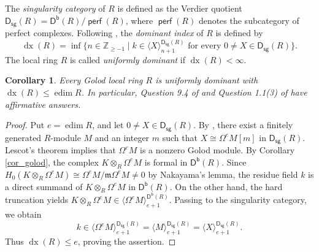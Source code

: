 \documentclass[10pt]{amsart}
\newtheorem{cor}[thm]{Corollary}
\theoremstyle{definition}
\theoremstyle{remark}
\numberwithin{equation}{thm}
\def\db{\operatorname{\mathsf{D^b}}}
\def\ds{\operatorname{\mathsf{D_{sg}}}}
\def\edim{\operatorname{edim}}
\def\ge{\geqslant}
\def\inf{\operatorname{inf}}
\def\le{\leqslant}
\def\m{\mathfrak{m}}
\def\perf{\operatorname{\mathsf{perf}}}
\def\syz{\Omega}
\def\ZZ{\mathbb{Z}}
\begin{document}
The {\em singularity category} of $R$ is defined as the Verdier quotient $\ds(R)=\db(R)/\perf(R)$, where $\perf(R)$ denotes the subcategory of perfect complexes.
Following \cite[Definition 3.4]{KT2026}, the {\em dominant index} of $R$ is defined by
\[
\operatorname{dx}(R)=\inf\{n\in\ZZ_{\ge-1}\mid k\in\langle X\rangle_{n+1}^{\ds(R)}\text{ for every }0\ne X\in\ds(R)\}.
\]
The local ring $R$ is called {\em uniformly dominant} if $\operatorname{dx}(R)<\infty$.
\begin{cor}\label{cor_dom}
Every Golod local ring $R$ is uniformly dominant with $\operatorname{dx}(R)\le\edim R$. 
In particular, Question 9.4 of \cite{T2023} and Question 1.1(3) of \cite{KT2026} have affirmative answers.
\end{cor}
\begin{proof}
Put $e=\edim R$, and let $0\ne X\in\ds(R)$. 
By \cite[Lemma 2.4(2)]{DT2015}, there exist a finitely generated $R$-module $M$ and an integer $m$ such that $X\cong\syz^e M[m]$ in $\ds(R)$. 
Lescot's theorem \cite[Theorem 5.3.2(2)]{A1998} implies that $\syz^e M$ is a nonzero Golod module.
By Corollary \ref{cor_golod}, the complex $K\otimes_R\syz^e M$ is formal in $\db(R)$. 
Since $H_0(K\otimes_R\syz^e M)\cong\syz^e M/\m\syz^e M\ne0$ by Nakayama's lemma, the residue field $k$ is a direct summand of $K\otimes_R\syz^e M$ in $\db(R)$.
On the other hand, the hard truncation yields $K\otimes_R\syz^e M\in\langle\syz^e M\rangle_{e+1}^{\db(R)}$. 
Passing to the singularity category, we obtain
\[
k\in\langle\syz^e M\rangle_{e+1}^{\ds(R)}=\langle M\rangle_{e+1}^{\ds(R)}=\langle X\rangle_{e+1}^{\ds(R)}.
\]
Thus $\operatorname{dx}(R)\le e$, proving the assertion.
\end{proof}
\end{document}
